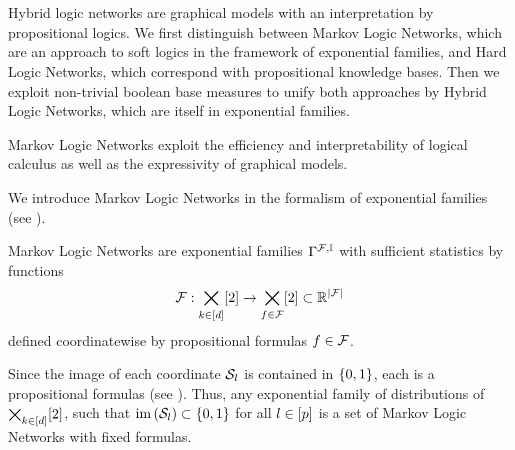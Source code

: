 \chapter{\chatextnetworkRepresentation}\label{cha:networkRepresentation}

Hybrid logic networks are graphical models with an interpretation by propositional logics.
We first distinguish between Markov Logic Networks, which are an approach to soft logics in the framework of exponential families, and Hard Logic Networks, which correspond with propositional knowledge bases.
Then we exploit non-trivial boolean base measures to unify both approaches by Hybrid Logic Networks, which are itself in exponential families.




Markov Logic Networks exploit the efficiency and interpretability of logical calculus as well as the expressivity of graphical models.


We introduce Markov Logic Networks in the formalism of exponential families (see ).

\begin{definition}
    \label{def:mln}
    Markov Logic Networks are exponential families $\Gamma^{\mathcal{F},\mathbb{I}}$ with sufficient statistics by functions
    \begin{align*}
        \mathcal{F} : \bigtimes_{k\in[d]}[2] \rightarrow \bigtimes_{f\in\mathcal{F}}[2] \subset \mathbb{R}^{\left|\mathcal{F}\right|}
    \end{align*}
    defined coordinatewise by propositional formulas $f\in\mathcal{F}$.
\end{definition}

Since the image of each coordinate $\mathcal{S}_{l}$ is contained in $\{0,1\}$, each is a propositional formulas (see ).
Thus, any exponential family of distributions of $\bigtimes_{k\in[d]}[2]$, such that $\mathrm{im}\left(\mathcal{S}_{l}\right)\subset\{0,1\}$ for all $l\in[p]$ is a set of Markov Logic Networks with fixed formulas.

